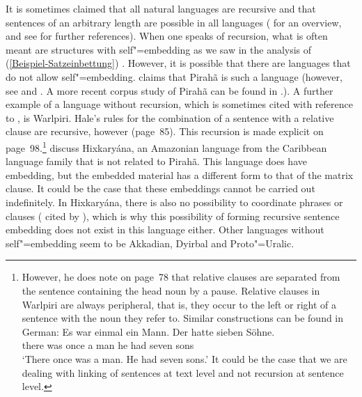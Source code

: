 \addlines
It is sometimes claimed that all natural languages are recursive and that sentences of an arbitrary
length are possible in all languages (\citealp*[]{HNG2005a} for an overview, and see  for further references). When one speaks of recursion,
what is often meant are structures with self"=embedding as we saw in the analysis of (\ref{Beispiel-Satzeinbettung}) \citep{Fitch2010a}. 
However, it is possible that there are languages that do not allow self"=embedding. \citet{Everett2005a-u} claims that
Pirah{\~a} is such a language (however, see  and
. A more recent corpus study of Pirahã can be found in .). 
A further example of a language without recursion, which is sometimes cited with reference to , is Warlpiri.
Hale's rules for the combination of a sentence with a relative clause are recursive, however (page~85). This recursion is made
explicit on page~98.\footnote{%
	However, he does note on page~78 that relative clauses are separated from the sentence
        containing the head noun by a pause. Relative clauses in Warlpiri are always peripheral, that is, they occur to the left or right of a sentence with the noun they refer to. Similar
	constructions can be found in German:
\ea
\gll Es war einmal ein Mann. Der hatte sieben Söhne.\\
	 there was once a man he had seven sons\\
\glt `There once was a man. He had seven sons.'
\z
It could be the case that we are dealing with linking of sentences at text level and not recursion at sentence level.
} \citet[]{PS2010a} discuss Hixkaryána, an Amazonian language from the Caribbean language
family that is not related to Pirah{\~a}. This language does have embedding, but the embedded
material has a different form to that of the matrix clause. It could be the case that these embeddings cannot be carried out indefinitely. In Hixkaryána,
there is also no possibility to coordinate phrases or clauses ( cited by ), which is why this possibility of forming recursive sentence embedding does not
exist in this language either. Other languages without self"=embedding seem to be Akkadian, Dyirbal and Proto"=Uralic.
	
